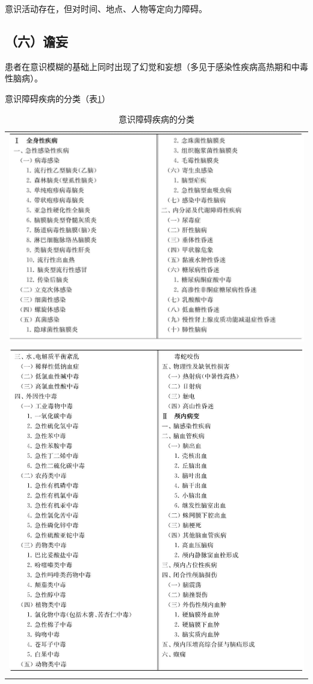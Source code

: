 意识活动存在，但对时间、地点、人物等定向力障碍。

\subsection{（六）谵妄}

患者在意识模糊的基础上同时出现了幻觉和妄想（多见于感染性疾病高热期和中毒性脑病）。

意识障碍疾病的分类（表\ref{tab49-1}）

\begin{longtable}{c}
 \caption{意识障碍疾病的分类}
 \label{tab49-1}
 \endfirsthead
 \caption[]{意识障碍疾病的分类}
 \endhead
 \includegraphics[width=\textwidth,height=\textheight,keepaspectratio]{./images/Image00305.jpg}\\
 \includegraphics[width=\textwidth,height=\textheight,keepaspectratio]{./images/Image00306.jpg}
 \end{longtable}

